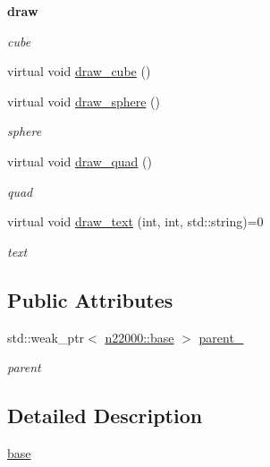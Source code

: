 \begin{Indent}{\bf draw}\par
{\em \label{_amgrp817491bc777731f0f0c6e485f28e4d86}
 cube }\begin{DoxyCompactItemize}
\item 
virtual void \hyperlink{classnebula_1_1platform_1_1renderer_1_1base_a0da71c3c6f5ee8e7644594c424211271}{draw\_\-cube} ()
\item 
virtual void \hyperlink{classnebula_1_1platform_1_1renderer_1_1base_ab11ea0309016e4687bbf26808245c3dd}{draw\_\-sphere} ()
\begin{DoxyCompactList}\small\item\em sphere \item\end{DoxyCompactList}\item 
virtual void \hyperlink{classnebula_1_1platform_1_1renderer_1_1base_a5efb6122adb9602316c6c7aabbf87e1d}{draw\_\-quad} ()
\begin{DoxyCompactList}\small\item\em quad \item\end{DoxyCompactList}\item 
virtual void \hyperlink{classnebula_1_1platform_1_1renderer_1_1base_afee2147d5f479f6c859c600fc224012c}{draw\_\-text} (int, int, std::string)=0
\begin{DoxyCompactList}\small\item\em text \item\end{DoxyCompactList}\end{DoxyCompactItemize}
\end{Indent}
\subsection*{Public Attributes}
\begin{DoxyCompactItemize}
\item 
std::weak\_\-ptr$<$ \hyperlink{classnebula_1_1platform_1_1window_1_1base}{n22000::base} $>$ \hyperlink{classnebula_1_1platform_1_1renderer_1_1base_ab07a2967a0fcd427c5429bc0a67d5b0d}{parent\_\-}
\begin{DoxyCompactList}\small\item\em parent \item\end{DoxyCompactList}\end{DoxyCompactItemize}


\subsection{Detailed Description}
\hyperlink{classnebula_1_1platform_1_1renderer_1_1base}{base} 

